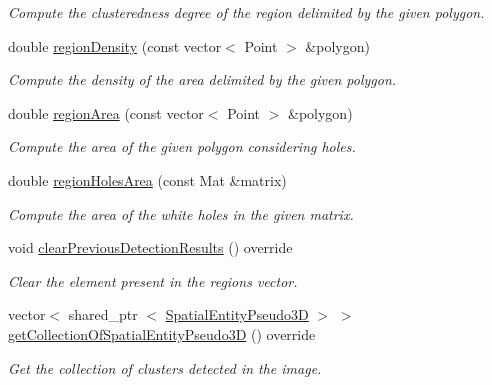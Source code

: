 \begin{DoxyCompactItemize}
\begin{DoxyCompactList}\small\item\em \-Compute the clusteredness degree of the region delimited by the given polygon. \end{DoxyCompactList}\item 
double \hyperlink{classmultiscale_1_1analysis_1_1RegionDetector_a6beb6b2ecaccd60130bcf8dd808750b8}{region\-Density} (const vector$<$ \-Point $>$ \&polygon)
\begin{DoxyCompactList}\small\item\em \-Compute the density of the area delimited by the given polygon. \end{DoxyCompactList}\item 
double \hyperlink{classmultiscale_1_1analysis_1_1RegionDetector_a938fa8d165c87dc69e962883942072d2}{region\-Area} (const vector$<$ \-Point $>$ \&polygon)
\begin{DoxyCompactList}\small\item\em \-Compute the area of the given polygon considering holes. \end{DoxyCompactList}\item 
double \hyperlink{classmultiscale_1_1analysis_1_1RegionDetector_ab110a0a67852484c700ff035089fce18}{region\-Holes\-Area} (const \-Mat \&matrix)
\begin{DoxyCompactList}\small\item\em \-Compute the area of the white holes in the given matrix. \end{DoxyCompactList}\item 
void \hyperlink{classmultiscale_1_1analysis_1_1RegionDetector_a4a89f3a28cbb473acc32f22b49d09389}{clear\-Previous\-Detection\-Results} () override
\begin{DoxyCompactList}\small\item\em \-Clear the element present in the regions vector. \end{DoxyCompactList}\item 
vector$<$ shared\-\_\-ptr\*
$<$ \hyperlink{classmultiscale_1_1analysis_1_1SpatialEntityPseudo3D}{\-Spatial\-Entity\-Pseudo3\-D} $>$ $>$ \hyperlink{classmultiscale_1_1analysis_1_1RegionDetector_a729a0433d9b929624960ae86e7cc1f23}{get\-Collection\-Of\-Spatial\-Entity\-Pseudo3\-D} () override
\begin{DoxyCompactList}\small\item\em \-Get the collection of clusters detected in the image. \end{DoxyCompactList}\item 

\end{DoxyCompactItemize}

